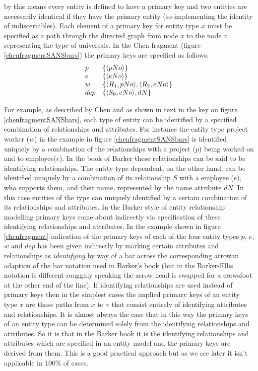 \documentclass[10pt,a4paper]{article}
\newcommand{\set}[1]{\left\{#1\right\}}
\newcommand{\veee}{v}
\begin{document}
by this means every entity is defined to have a primary key and two entities are necessarily identical if they have the primary entity (so implementing the identity of indiscernibles). Each element of a primary key for entity type $x$ must be specified as a path through the directed graph from node $x$ to the node $\veee$ representing the type of universals.  In the Chen fragment (figure \ref{chenfragmentSANSbars}) the primary keys are specified as follows:
$$
\begin{array}{l l}
p & \set{\tuple{pNo}} \\
e & \set{\tuple{eNo}} \\
w & \set{\tuple{R_1,pNo},\tuple{R_2,eNo}} \\
dep & \set{\tuple{S_0,eNo},dN}
\end{array}
$$

For example, as described by Chen and as shown in text in the key on figure \ref{chenfragmentSANSbars}, each
type of entity can be identified by a specified combination of relationships and attributes. For instance the entity type 
project worker ($w$) in the example in figure \ref{chenfragmentSANSbars} is identified uniquely by a combination of the relationships with a project ($p$) being worked on  and to employee($e$). 
In the book of Barker these relationships can be said to be identifying relationships. 
The entity type dependent, on the other hand, can
be identified uniquely by a combination of its relationship $S$ with a employee ($e$), 
who supports them, and their name, represented by the name attribute $dN$. 
In this case entities of the type can uniquely identified 
by a certain combination of its relationships and attributes.   In the Barker 
style of entity relationship modelling primary keys come about indirectly via specification of these identifying relationships and attributes. In the example shown in figure \ref{chenfragment} indication of the primary keys of each of the four entity types $p$, $e$, $w$ and $dep$ has been given indirectly by marking certain attributes and relationships as \textit{identifying} by way of a bar across the corresponding arrowan adaption of the bar notation used in Barker's book (but in the Barker-Ellis notation is different rougghly speaking the arrow head is swapped for a crowsfoot at the other end of the line). If identifying relationships are used instead
of primary keys then in the simplest cases the implied primary keys of an entity type $x$ are those paths from $x$ to
$\veee$ that consist entirely of identifying attributes and relationships. 
It is almost always the case that in this way the primary keys of an entity type can be determined solely from the identifying relationships
and attributes. So it is that in the Barker book it is the identifying relationships and attributes
which are specified in an entity model and the primary keys are derived from them. This is a good practical approach but as we see later it isn't applicable in 100\% of cases.
\end{document}
